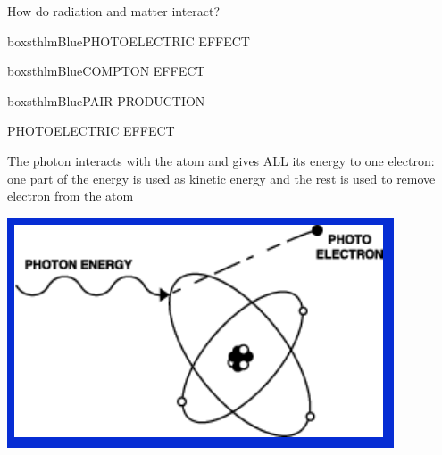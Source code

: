 \begingroup

\begin{frame}{How do radiation and matter interact?}

\pause

\begin{beamercolorbox}[wd=\linewidth,ht=5ex,dp=3ex]{boxsthlmBlue}\centering PHOTOELECTRIC EFFECT\end{beamercolorbox}

\pause

\begin{beamercolorbox}[wd=\linewidth,ht=5ex,dp=3ex]{boxsthlmBlue}\centering COMPTON EFFECT\end{beamercolorbox}

\pause

\begin{beamercolorbox}[wd=\linewidth,ht=5ex,dp=3ex]{boxsthlmBlue}\centering PAIR PRODUCTION \end{beamercolorbox}


\end{frame}
\endgroup

\begin{frame}{PHOTOELECTRIC EFFECT}

\vskip0.3cm
\alert{The photon interacts with the atom and gives ALL its energy to one electron: one part of the energy is used as kinetic energy and the rest is used to remove electron from the atom}

\vskip0.5cm
\centering
\includegraphics[scale=0.5]{figures/photoelectriceffect.png}

\end{frame}

